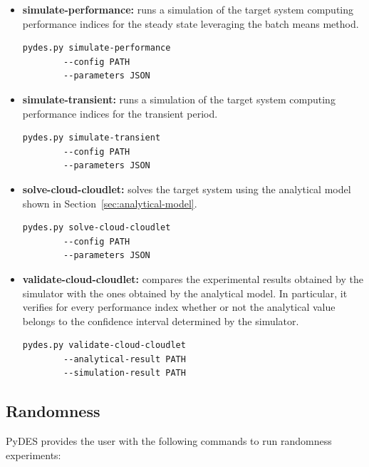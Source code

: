 \begin{itemize}
	
	\item \textbf{simulate-performance:} runs a simulation of the target system computing performance indices for the steady state leveraging the batch means method.
	\begin{lstlisting}[basicstyle=\tiny]
		pydes.py simulate-performance
		--config PATH
		--parameters JSON
	\end{lstlisting}
	
	\item \textbf{simulate-transient:} runs a simulation of the target system computing performance indices for the transient period. 
	\begin{lstlisting}[basicstyle=\tiny]
		pydes.py simulate-transient
		--config PATH
		--parameters JSON
	\end{lstlisting}
	
	\item \textbf{solve-cloud-cloudlet:} solves the target system using the analytical model shown in Section~\ref{sec:analytical-model}.
	\begin{lstlisting}[basicstyle=\tiny]
		pydes.py solve-cloud-cloudlet
		--config PATH
		--parameters JSON
	\end{lstlisting}
	
	\item \textbf{validate-cloud-cloudlet:} compares the experimental results obtained by the simulator with the ones obtained by the analytical model. In particular, it verifies for every performance index whether or not the analytical value belongs to the confidence interval determined by the simulator.
	\begin{lstlisting}[basicstyle=\tiny]
		pydes.py validate-cloud-cloudlet
		--analytical-result PATH
		--simulation-result PATH
	\end{lstlisting}
\end{itemize}

\subsection{Randomness}
PyDES provides the user with the following commands to run randomness experiments:

